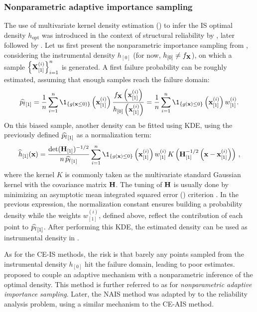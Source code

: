 \subsubsection{Nonparametric adaptive importance sampling}
The use of multivariate kernel density estimation () to infer the IS optimal density $h_{\mathrm{opt}}$ was introduced in the context of structural reliability by \cite{ang_1992_nis}, later followed by \citet{zhang_1996_NIS}.  
Let us first present the nonparametric importance sampling from \cite{zhang_1996_NIS}, considering the instrumental density $h_{[0]}$ (for now, $h_{[0]} \neq f_{\bf X}$), 
on which a sample $\left\{{\bf X}_{[1]}^{(i)}\right\}_{i=1}^n$ is generated. 
A first failure probability can be roughly estimated, assuming that enough samples reach the failure domain: 
\begin{equation}
    \what{\pf}_{[1]} = \frac1n \sum_{i=1}^{n} \1_{\{g(\bx \leq 0)\}}\left(\bx^{(i)}_{[1]}\right) \frac{f_\bX\left(\bx^{(i)}_{[1]}\right)}{h_{[0]}\left(\bx^{(i)}_{[1]}\right)}
    = \frac1n \sum_{i=1}^{n} \1_{\{g(\bx) \leq 0\}}\left(\bx^{(i)}_{[1]}\right) w^{(i)}_{[1]}. 
\end{equation}
On this biased sample, another density can be fitted using KDE, using the previously defined $\widehat{p_\mathrm{f}}_{[1]}$ as a normalization term: 
\begin{equation}
    \what{h}_{[1]}(\bx) = \frac{\mathrm{det}(\bH_{[1]})^{-1/2}}{n \, \what{\pf}_{[1]}} \sum_{i=1}^{n} 
            \1_{\{g(\bx) \leq 0\}}\left(\bx^{(i)}_{[1]}\right) w^{(i)}_{[1]} \, K\left(\bH_{[1]}^{-1/2} \left(\bx - \bx^{(i)}_{[1]}\right)\right)\, , 
\end{equation}
where the kernel $K$ is commonly taken as the multivariate standard Gaussian kernel with the covariance matrix ${\bf H}$. 
The tuning of ${\bf H}$ is usually done by minimizing an asymptotic mean integrated squared error () criterion \citep{glad_2007_kde_amise}. 
In the previous expression, the normalization constant ensures building a probability density while the weights $w^{(i)}_{[1]}$, defined above, reflect the contribution of each point to $\widehat{p_\mathrm{f}}_{[1]}$.  
After performing this KDE, the estimated density can be used as instrumental density in .

As for the CE-IS methods, the risk is that barely any points sampled from the instrumental density $h_{[0]}$ hit the failure domain, leading to poor estimates. 
\citet{zhang_1996_NIS} proposed to couple an adaptive mechanism with a nonparametric inference of the optimal density. 
This method is further referred to as  for \textit{nonparametric adaptive importance sampling}. 
Later, the NAIS method was adapted by \cite{Morio_RESS_2011} to the reliability analysis problem, using a similar mechanism to the CE-AIS method. 

